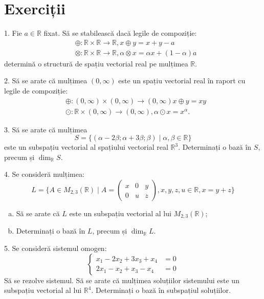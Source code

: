 \documentclass[11pt,a4paper]{article}
\newcommand\RR{\mathbb{R}}
\theoremstyle{dotless}
\theoremstyle{dotlessdr}
\begin{document}

\section{Exerciții}

1. Fie $a \in \RR$ fixat. Să se stabilească dacă legile de compoziție:
\begin{align*}
  & \oplus : \RR \times \RR \to \RR, x \oplus y = x + y - a \\
  & \otimes : \RR \times \RR \to \RR, \alpha \otimes x = \alpha x + (1 - \alpha) a
\end{align*}
determină o structură de spațiu vectorial real pe mulțimea $\RR$.

\vspace{1cm}

2. Să se arate că mulțimea $(0, \infty)$ este un spațiu vectorial real în raport
cu legile de compoziție:
\begin{align*}
  & \oplus : (0, \infty) \times (0, \infty) \to (0, \infty) x \oplus y = xy \\
  & \odot : \RR \times (0, \infty) \to (0, \infty), \alpha \odot x = x^\alpha.
\end{align*}

\vspace{1cm}

3. Să se arate că mulțimea
\[
  S = \{(\alpha - 2 \beta; \alpha + 3 \beta; \beta) \mid \alpha, \beta \in \RR \}
\]
este un subspațiu vectorial al spațiului vectorial real $\RR^3$. Determinați
o bază în $S$, precum și $\dim_\RR S$.

\vspace{1cm}

4. Se consideră mulțimea:
\[
  L = \Big\{ A \in M_{2,3}(\RR) \mid %
  A = \begin{pmatrix}
    x & 0 & y \\
    0 & u & z
  \end{pmatrix}, x, y, z, u \in \RR, x = y + z \Big\}
\]
\begin{enumerate}[(a)]
\item Să se arate că $L$ este un subspațiu vectorial al lui $M_{2,3}(\RR)$;
\item Determinați o bază în $L$, precum și $\dim_\RR L$.
\end{enumerate}

\vspace{1cm}

5. Se consideră sistemul omogen:
\[
  \begin{cases}
    x_1 - 2x_2 + 3x_3 + x_4 &= 0 \\
    2x_1 - x_2 + x_3 - x_4 &= 0
  \end{cases}
\]
Să se rezolve sistemul. Să se arate că mulțimea soluțiilor sistemului este un
subspațiu vectorial al lui $\RR^4$. Determinați o bază în subspațiul soluțiilor.
\end{document}
